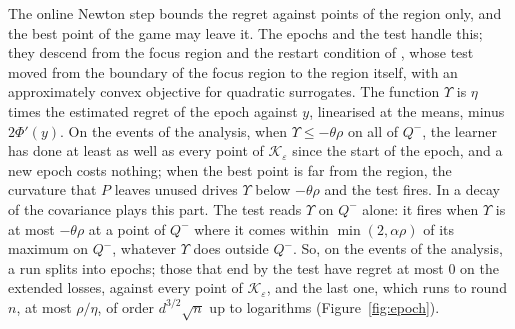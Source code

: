 \documentclass[11pt]{amsart}
\theoremstyle{definition}
\numberwithin{equation}{section}
\newcommand{\cK}{\mathcal{K}}
\begin{document}
The online Newton step bounds the regret against points of the region only, and the best point of the game may leave it. The epochs and the test handle this; they descend from the focus region and the restart condition of \cite{BEL21}, whose test \cite[Section~5]{SRN21} moved from the boundary of the focus region to the region itself, with an approximately convex objective for quadratic surrogates. The function $\Upsilon$ is $\eta$ times the estimated regret of the epoch against $y$, linearised at the means, minus $2\Phi'(y)$. On the events of the analysis, when $\Upsilon\le-\theta\rho$ on all of $Q^-$, the learner has done at least as well as every point of $\cK_\varepsilon$ since the start of the epoch, and a new epoch costs nothing; when the best point is far from the region, the curvature that $P$ leaves unused drives $\Upsilon$ below $-\theta\rho$ and the test fires. In \cite[Chapter~11]{Lat24} a decay of the covariance plays this part. The test reads $\Upsilon$ on $Q^-$ alone: it fires when $\Upsilon$ is at most $-\theta\rho$ at a point of $Q^-$ where it comes within $\min(2,\alpha\rho)$ of its maximum on $Q^-$, whatever $\Upsilon$ does outside $Q^-$. So, on the events of the analysis, a run splits into epochs; those that end by the test have regret at most $0$ on the extended losses, against every point of $\cK_\varepsilon$, and the last one, which runs to round $n$, at most $\rho/\eta$, of order $d^{3/2}\sqrt n$ up to logarithms (Figure~\ref{fig:epoch}).
\end{document}
